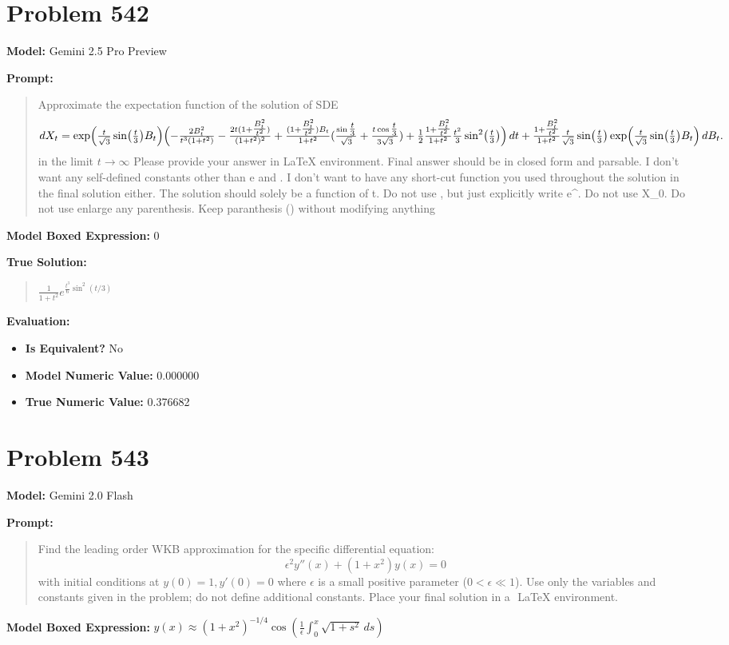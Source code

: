 \documentclass{article}
\begin{document}
\section*{Problem 542}
\textbf{Model:} Gemini 2.5 Pro Preview

\textbf{Prompt:}
\begin{quote}
Approximate the expectation function of the solution of SDE $$ dX_t=\exp\Bigl(\tfrac{t}{\sqrt3}\sin\bigl(\tfrac{t}{3}\bigr)B_t\Bigr)\Bigl(-\tfrac{2B_t^2}{t^3(1+t^2)}-\tfrac{2t(1+\tfrac{B_t^2}{t^2})}{(1+t^2)^2}+\tfrac{(1+\tfrac{B_t^2}{t^2})B_t}{1+t^2}(\tfrac{\sin\tfrac{t}{3}}{\sqrt3}+\tfrac{t\cos\tfrac{t}{3}}{3\sqrt3})+\tfrac12\tfrac{1+\tfrac{B_t^2}{t^2}}{1+t^2}\tfrac{t^2}{3}\sin^2\bigl(\tfrac{t}{3}\bigr)\Bigr)\,dt+\tfrac{1+\tfrac{B_t^2}{t^2}}{1+t^2}\tfrac{t}{\sqrt3}\sin\bigl(\tfrac{t}{3}\bigr)\exp\Bigl(\tfrac{t}{\sqrt3}\sin\bigl(\tfrac{t}{3}\bigr)B_t\Bigr)\,dB_t.$$ in the limit $t \to \infty$ Please provide your answer in LaTeX \boxed{} environment. Final answer should be in closed form and parsable. I don't want any self-defined constants other than e and \pi. I don't want to have any short-cut function you used throughout the solution in the final solution either. The solution should solely be a function of t. Do not use \exp, but just explicitly write e^. Do not use X_0. Do not use enlarge any parenthesis. Keep paranthesis () without modifying anything
\end{quote}
\textbf{Model Boxed Expression:} $0$

\textbf{True Solution:}
\begin{quote}
$\frac{1}{1 + t^2} e^{\frac{t^3}{6} \sin^2(t/3)}$
\end{quote}

\textbf{Evaluation:}
\begin{itemize}
\item \textbf{Is Equivalent?} No
\item \textbf{Model Numeric Value:} 0.000000
\item \textbf{True Numeric Value:} 0.376682
\end{itemize}
\vspace{1cm}
\section*{Problem 543}
\textbf{Model:} Gemini 2.0 Flash

\textbf{Prompt:}
\begin{quote}
Find the leading order WKB approximation for the specific differential equation: $$ \epsilon^2 y''(x) + (1+x^2) y(x) = 0 $$ with initial conditions at $y(0) = 1, y'(0) = 0$ where $\epsilon$ is a small positive parameter ($0 < \epsilon \ll 1$). Use only the variables and constants given in the problem; do not define additional constants. Place your final solution in a $\boxed{}$ LaTeX environment.
\end{quote}
\textbf{Model Boxed Expression:} $y(x) \approx \left(1+x^2\right)^{-1/4} \cos\left(\frac{1}{\epsilon} \int_0^x \sqrt{1+s^2} \, ds\right)$
\end{document}
